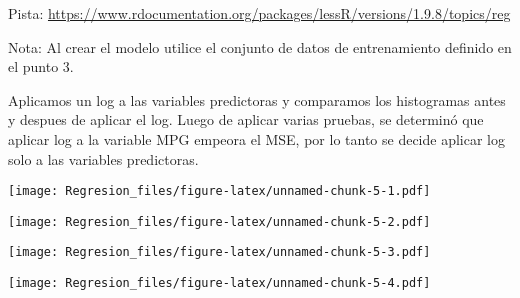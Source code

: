 \documentclass[]{article}
\newenvironment{Shaded}{\begin{snugshade}}{\end{snugshade}}
\newcommand{\KeywordTok}[1]{\textcolor[rgb]{0.13,0.29,0.53}{\textbf{#1}}}
\newcommand{\NormalTok}[1]{#1}
\newcommand{\OperatorTok}[1]{\textcolor[rgb]{0.81,0.36,0.00}{\textbf{#1}}}
\newcommand{\StringTok}[1]{\textcolor[rgb]{0.31,0.60,0.02}{#1}}
\begin{document}
Pista:
\url{https://www.rdocumentation.org/packages/lessR/versions/1.9.8/topics/reg}

Nota: Al crear el modelo utilice el conjunto de datos de entrenamiento
definido en el punto 3.

Aplicamos un log a las variables predictoras y comparamos los
histogramas antes y despues de aplicar el log. Luego de aplicar varias
pruebas, se determinó que aplicar log a la variable MPG empeora el MSE,
por lo tanto se decide aplicar log solo a las variables predictoras.

\begin{Shaded}
\end{Shaded}

\texttt{[image: Regresion\_files/figure-latex/unnamed-chunk-5-1.pdf]}

\begin{Shaded}
\end{Shaded}

\texttt{[image: Regresion\_files/figure-latex/unnamed-chunk-5-2.pdf]}

\begin{Shaded}
\end{Shaded}

\texttt{[image: Regresion\_files/figure-latex/unnamed-chunk-5-3.pdf]}

\begin{Shaded}
\end{Shaded}

\texttt{[image: Regresion\_files/figure-latex/unnamed-chunk-5-4.pdf]}
\end{document}
